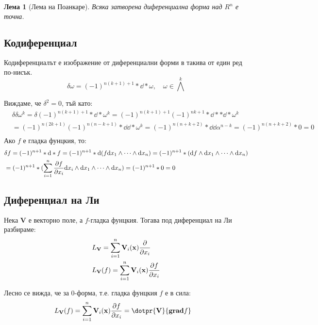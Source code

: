 \documentclass[12pt]{article}
\newtheorem{lemma}{Лема}
\begin{document}
\begin{large}
\begin{lemma}[Лема на Поанкаре]
Всяка затворена диференциална форма над $R^n$ е точна.
\end{lemma}

\subsection{Кодиференциал}
Кодиференциалът е изображение от диференциални форми в такива от един ред по-нисък.
\[
\delta \omega=(-1)^{n(k+1)+1}\ast \dd \ast \omega, \quad \omega \in {\bigwedge}^k
\]

Виждаме, че $\delta^2=0$, тъй като:
\begin{align*}
&\delta \delta \omega^k = \delta (-1)^{n(k+1)+1}\ast \dd \ast \omega^k = (-1)^{n(k+1)+1} (-1)^{nk+1} \ast \dd \ast \ast \dd \ast \omega^k \\
&= (-1)^{n(2k+1)} (-1)^{n(n-k+1)} \ast \dd \dd \ast \omega^k = (-1)^{n(n+k+2)} \ast \dd \dd \alpha^{n-k} = (-1)^{n(n+k+2)} \ast 0 = 0\\
\end{align*}
Ако $f$ е гладка фунцкия, то: 
\begin{align*}
&\delta f = (-1)^{n+1} \ast \dd \ast f = (-1)^{n+1} \ast \dd(f \dd x_1 \wedge \cdots \wedge \dd x_n) = (-1)^{n+1} \ast (\dd f \wedge \dd x_1 \wedge \cdots \wedge \dd x_n) \\
&=(-1)^{n+1} \ast (\sum_{i=1}^{n} \pdv{f}{x_i} \dd x_i \wedge \dd x_1 \wedge \cdots \wedge \dd x_n) = (-1)^{n+1} \ast 0 = 0
\end{align*}

\subsection{Диференциал на Ли}
Нека $\mathbf{V}$ е векторно поле, а $f$-гладка фунцкия. Тогава под диференциал на Ли разбираме:
\begin{align*}
&L_\mathbf{V} = \sum_{i=1}^{n}\mathbf{V}_i(\mathbf{x})\pdv{}{x_i} \\
&L_\mathbf{V}(f)=\sum_{i=1}^{n}\mathbf{V}_i(\mathbf{x})\pdv{f}{x_i}
\end{align*}

Лесно се вижда, че за $0$-форма, т.е. гладка фунцкия $f$ е в сила:
\begin{align*}
&L_\mathbf{V}(f)=\sum_{i=1}^{n}\mathbf{V}_i(\mathbf{x})\pdv{f}{x_i}= \dotpr{\mathbf{V}}{\mathbf{grad} f}
\end{align*}


\end{large}
\end{document}
